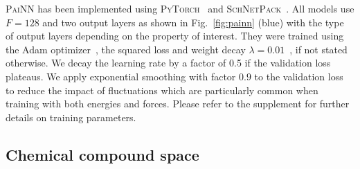 \documentclass[reprint,
amsmath,amssymb,
 aip,jcp
]{revtex4-2}
\newcommand{\painn}{\textsc{PaiNN}}
\begin{document}
\painn{} has been implemented using \textsc{PyTorch}~\cite{paszke2019pytorch} and \textsc{SchNetPack}~\cite{schutt2018schnetpack}.
All models use $F=128$ and two output layers as shown in Fig.~\ref{fig:painn} (blue) with the type of output layers depending on the property of interest.
They were trained using the Adam optimizer~\cite{kingma2014adam}, the squared loss and weight decay $\lambda=0.01$~\cite{loshchilov2017decoupled}, if not stated otherwise.
We decay the learning rate by a factor of 0.5 if the validation loss plateaus. We apply exponential smoothing with factor $0.9$ to the validation loss to reduce the impact of fluctuations which are particularly common when training with both energies and forces.
Please refer to the supplement for further details on training parameters.

\subsection{Chemical compound space}
\end{document}
